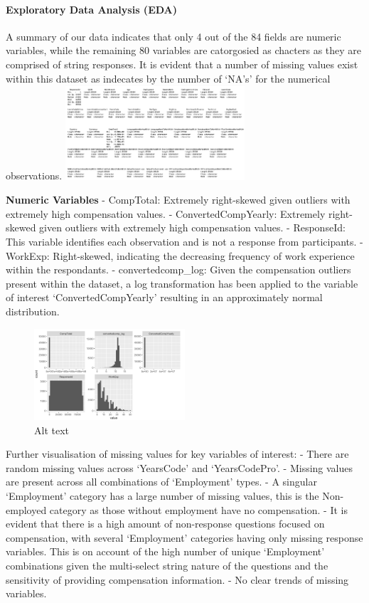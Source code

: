 \documentclass[
  12pt,
]{article}
\begin{document}
\hypertarget{exploratory-data-analysis-eda}{%
\paragraph{Exploratory Data Analysis
(EDA)}\label{exploratory-data-analysis-eda}}

A summary of our data indicates that only 4 out of the 84 fields are
numeric variables, while the remaining 80 variables are catorgosied as
chacters as they are comprised of string responses. It is evident that a
number of missing values exist within this dataset as indecates by the
number of `NA's' for the numerical observations.
\includegraphics[width=0.5\textwidth,height=0.5\textheight]{Missing_data.png}

\textbf{Numeric Variables} - CompTotal: Extremely right-skewed given
outliers with extremely high compensation values. - ConvertedCompYearly:
Extremely right-skewed given outliers with extremely high compensation
values. - ResponseId: This variable identifies each observation and is
not a response from participants. - WorkExp: Right-skewed, indicating
the decreasing frequency of work experience within the respondants. -
convertedcomp\_log: Given the compensation outliers present within the
dataset, a log transformation has been applied to the variable of
interest `ConvertedCompYearly' resulting in an approximately normal
distribution.

\begin{figure}
\centering
\includegraphics[width=0.5\textwidth,height=0.5\textheight]{Numerical_variables_hist.png}
\caption{Alt text}
\end{figure}

Further visualisation of missing values for key variables of interest: -
There are random missing values across `YearsCode' and `YearsCodePro'. -
Missing values are present across all combinations of `Employment'
types. - A singular `Employment' category has a large number of missing
values, this is the Non-employed category as those without employment
have no compensation. - It is evident that there is a high amount of
non-response questions focused on compensation, with several
`Employment' categories having only missing response variables. This is
on account of the high number of unique `Employment' combinations given
the multi-select string nature of the questions and the sensitivity of
providing compensation information. - No clear trends of missing
variables.
\end{document}
